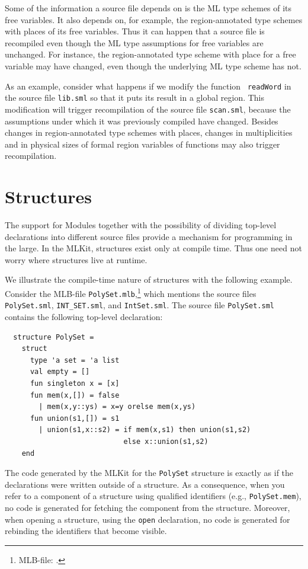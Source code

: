 \documentclass[12pt]{book}
\begin{document}
Some of the information a source file depends on is the ML type
schemes of its free variables. It also depends on, for example, the
region-annotated type schemes with places of its free variables.  Thus
it can happen that a source file is recompiled even though the ML type
assumptions for free variables are unchanged. For instance, the
region-annotated type scheme with place for a free variable may have
changed, even though the underlying ML type scheme has not.

As an example, consider what happens if we modify the function {\tt
  readWord} in the source file {\tt lib.sml} so that it puts its
result in a global region. This modification will trigger
recompilation of the source file {\tt scan.sml}, because the
assumptions under which it was previously compiled have changed.
Besides changes in region-annotated type schemes with places, changes
in multiplicities and in physical sizes of formal region variables of
functions may also trigger recompilation.


\section{Structures}
The support for Modules together with the possibility of dividing
top-level declarations into different source files provide a mechanism
for programming in the large. In the MLKit, structures exist only at
compile time.  Thus one need not worry where
%
structures live at runtime.

We illustrate the compile-time nature of structures with the following
example. Consider the MLB-file {\tt PolySet.mlb},\footnote{MLB-file:
  .} which mentions the source files {\tt
  PolySet.sml}, {\tt INT\_SET.sml}, and {\tt IntSet.sml}. The source
file {\tt PolySet.sml} contains the following top-level declaration:
\begin{verbatim}
  structure PolySet =
    struct
      type 'a set = 'a list
      val empty = []
      fun singleton x = [x]
      fun mem(x,[]) = false
        | mem(x,y::ys) = x=y orelse mem(x,ys)
      fun union(s1,[]) = s1
        | union(s1,x::s2) = if mem(x,s1) then union(s1,s2)
                            else x::union(s1,s2)
    end
\end{verbatim}
The code generated by the MLKit for the {\tt PolySet} structure is
exactly as if the declarations were written outside of a structure.
As a consequence, when you refer to a component of a structure using
qualified identifiers (e.g., {\tt PolySet.mem}), no code is generated
for fetching the component from the structure. Moreover, when opening
a structure, using the
%
{\tt open} declaration, no code is generated for rebinding the
identifiers that become visible.
\end{document}
